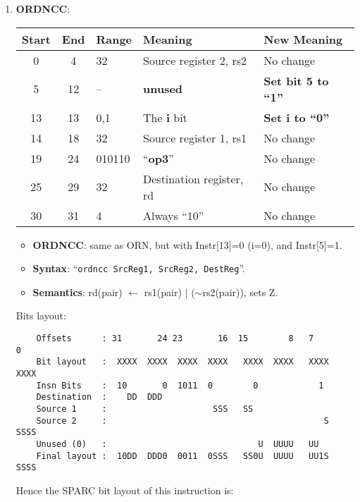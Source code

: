 \begin{enumerate}
\item \textbf{ORDNCC}:\\
  \begin{center}
    \begin{tabular}[p]{|c|c|l|l|l|}
      \hline
      \textbf{Start} & \textbf{End} & \textbf{Range} & \textbf{Meaning} &
                                                                          \textbf{New Meaning}\\
      \hline
      0 & 4 & 32 & Source register 2, rs2 & No change \\
      5 & 12 & -- & \textbf{unused} & \textbf{Set bit 5 to ``1''} \\
      13 & 13 & 0,1 & The \textbf{i} bit & \textbf{Set i to ``0''} \\
      14 & 18 & 32 & Source register 1, rs1 & No change \\
      19 & 24 & 010110 & ``\textbf{op3}'' & No change \\
      25 & 29 & 32 & Destination register, rd & No change \\
      30 & 31 & 4 & Always ``10'' & No change \\
      \hline
    \end{tabular}
  \end{center}
  \begin{itemize}
  \item []\textbf{ORDNCC}: same as ORN, but with Instr[13]=0 (i=0), and
    Instr[5]=1.
  \item []\textbf{Syntax}: ``\texttt{ordncc  SrcReg1, SrcReg2, DestReg}''.
  \item []\textbf{Semantics}: rd(pair) $\leftarrow$ rs1(pair) $\vert$
    ($\sim$rs2(pair)), sets Z.
  \end{itemize}
  Bits layout:
\begin{verbatim}
    Offsets      : 31       24 23       16  15        8   7        0
    Bit layout   :  XXXX  XXXX  XXXX  XXXX   XXXX  XXXX   XXXX  XXXX
    Insn Bits    :  10       0  1011  0        0            1       
    Destination  :    DD  DDD                                       
    Source 1     :                     SSS   SS
    Source 2     :                                           S  SSSS
    Unused (0)   :                              U  UUUU   UU        
    Final layout :  10DD  DDD0  0011  0SSS   SS0U  UUUU   UU1S  SSSS
\end{verbatim}

  Hence the SPARC bit layout of this instruction is:


\end{enumerate}
